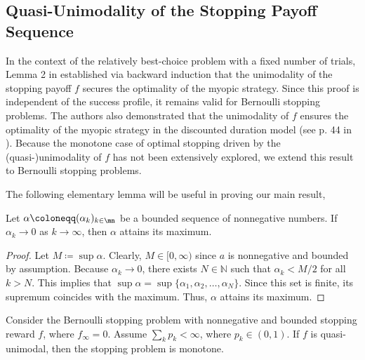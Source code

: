 \documentclass[11pt]{article}
\begin{document}
\subsection{Quasi-Unimodality of the Stopping Payoff Sequence}


In the context of the relatively best-choice problem with a fixed number of trials, Lemma 2 in \cite{FergusonHardwick} established via backward induction that the unimodality of the stopping payoff \( f \) secures the optimality of the myopic strategy. Since this proof is independent of the success profile, it remains valid for Bernoulli stopping problems. The authors also demonstrated that the unimodality of \( f \) ensures the optimality of the myopic strategy in the discounted duration model (see p. 44 in \cite{FergusonHardwick}). Because the monotone case of optimal stopping driven by the (quasi-)unimodality  of \( f \) has not been extensively explored, we extend this result to Bernoulli stopping problems.

The following elementary lemma will be useful in proving our main result,

\begin{lemma}\label{lem.sup}
Let $\alpha \coloneqq(\alpha_k)_{k \in \mn}$ be a bounded sequence of nonnegative numbers. If  $\alpha_k \to 0$ as $k \to \infty$, then  $\alpha$ attains its maximum.
\end{lemma}
\begin{proof}
	Let $M \coloneqq \sup \alpha$. Clearly, $M \in [0, \infty)$ since $a$ is nonnegative and bounded by assumption. Because $\alpha_k \to 0$,  there exists $N \in \mathbb{N}$  such that $\alpha_k < M/2$ for all $k > N$. This implies that $\sup \alpha =\sup\bigl\{\alpha_1, \alpha_2, \ldots, \alpha_N\bigr\}$. Since this set is finite, its supremum coincides with the maximum. Thus, $\alpha$ attains its maximum.
\end{proof}
\begin{thm}\label{thm.unimodality_stopping_reward}
	Consider the Bernoulli stopping problem with nonnegative and bounded stopping reward $f$, where $f_\infty=0$. Assume $\sum_k p_k< \infty$, where $p_k \in (0,1 )$. 	If $f$ is quasi-unimodal, then the stopping problem is monotone.%
	
\end{thm}
\end{document}
